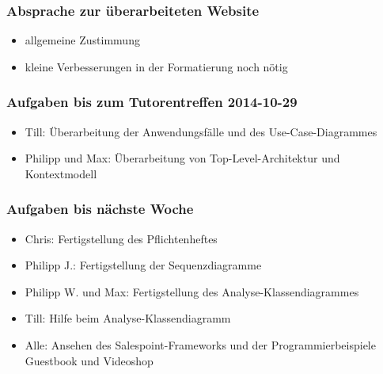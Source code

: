 \documentclass[12pt,a4paper]{article}
\begin{document}
\subsubsection*{Absprache zur überarbeiteten Website}
\begin{itemize}
\item allgemeine Zustimmung
\item kleine Verbesserungen in der Formatierung noch nötig
\end{itemize}

\subsubsection*{Aufgaben bis zum Tutorentreffen 2014-10-29}
\begin{itemize}
\item Till: Überarbeitung der Anwendungsfälle und des Use-Case-Diagrammes
\item Philipp und Max: Überarbeitung von Top-Level-Architektur und Kontextmodell
\end{itemize}

\subsubsection*{Aufgaben bis nächste Woche}
\begin{itemize}
\item Chris: Fertigstellung des Pflichtenheftes
\item Philipp J.: Fertigstellung der Sequenzdiagramme
\item Philipp W. und Max: Fertigstellung des Analyse-Klassendiagrammes
\item Till: Hilfe beim Analyse-Klassendiagramm
\item Alle: Ansehen des Salespoint-Frameworks und der Programmierbeispiele Guestbook und Videoshop
\end{itemize}
\end{document}
